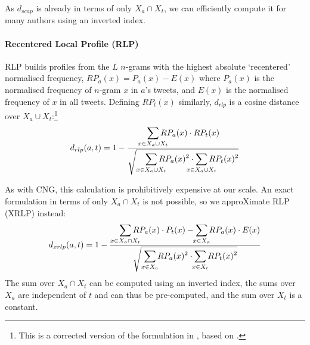 \documentclass[twocolumn,10pt]{article}
\begin{document}
As $d_{scap}$ is already in terms of only $X_a \cap X_t$, we can
efficiently compute it for many authors using an inverted index.

\paragraph{Recentered Local Profile (RLP)}
\hypertarget{par:rlp}{}
RLP\supercite{layton2012recentred} builds profiles
from the $L$ $n$-grams with the highest absolute `recentered'
normalised frequency,
$RP_a(x) = P_a(x) - E(x)$
where $P_a(x)$ is the normalised frequency of $n$-gram $x$ in
$a$'s tweets, and
$E(x)$ is the normalised frequency of $x$ in all tweets.
Defining $RP_t(x)$ similarly, 
$d_{rlp}$ is a cosine distance over
$X_a \cup X_t$:\footnote{
This is a corrected version of the formulation in \cite{layton2012recentred},
based on \cite{layton2014tutorial}.}
$$
d_{rlp}(a, t) = 1 -
\frac{\displaystyle
    \smashoperator{\sum_{x \in X_a \cup X_t}}
        RP_a(x) \cdot RP_t(x)
}{\displaystyle
    \sqrt{\smashoperator[r]{\sum_{x \in X_a \cup X_t}} RP_a(x)^2
    \cdot \smashoperator{\sum_{x \in X_a \cup X_t}} RP_t(x)^2}
}
$$

As with CNG, this calculation is prohibitively expensive at our scale.
An exact formulation in terms of only $X_a \cap X_t$ is not possible,
so we approXimate RLP (XRLP) instead\footnotemark:
$$
d_{xrlp}(a, t) = 1 -
\frac{\displaystyle
    \smashoperator[r]{\sum_{x \in X_a \cap X_t}}
        RP_a(x) \cdot P_t(x)
    - \smashoperator{\sum_{x \in X_a}}
        RP_a(x) \cdot E(x)
}{\displaystyle
    \sqrt{\smashoperator[r]{\sum_{x \in X_a}} RP_a(x)^2
    \cdot \smashoperator{\sum_{x \in X_t}} RP_t(x)^2}
}
$$
The sum over $X_a \cap X_t$ can be computed using an inverted index,
the sums over $X_a$ are independent of $t$ and can thus be pre-computed,
and the sum over $X_t$ is a constant.

\end{document}
